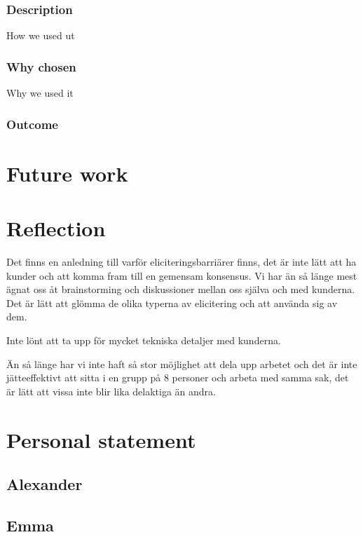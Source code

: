 \documentclass[a4paper]{article}
\begin{document}
    \subsubsection{Description}
    How we used ut
    \subsubsection{Why chosen}
    Why we used it
    \subsubsection{Outcome}
    
  \section{Future work}
  
  
  \section{Reflection}
  Det finns en anledning till varför eliciteringsbarriärer finns, det är inte lätt att ha kunder och att komma fram till en gemensam konsensus.
  Vi har än så länge mest ägnat oss åt brainstorming och diskussioner mellan oss själva och med kunderna. Det är lätt att glömma de olika typerna av elicitering och att använda sig av dem. 
  
  Inte lönt att ta upp för mycket tekniska detaljer med kunderna.

Än så länge har vi inte haft så stor möjlighet att dela upp arbetet och det är inte jätteeffektivt att sitta i en grupp på 8 personer och arbeta med samma sak, det är lätt att vissa inte blir lika delaktiga än andra. 


  \section{Personal statement}
  
  \subsection{Alexander}
  \subsection{Emma}
\end{document}
